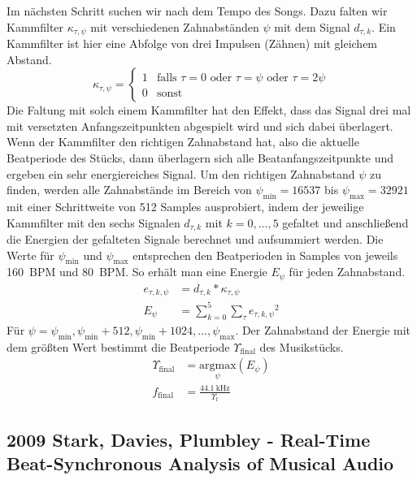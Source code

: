 {{{			%
			Im nächsten Schritt suchen wir nach dem Tempo des Songs.
			Dazu falten wir Kammfilter $\kappa_{\tau, \psi}$ mit verschiedenen Zahnabständen $\psi$ mit dem Signal $d_{\tau, k}$.
			Ein Kammfilter ist hier eine Abfolge von drei Impulsen (Zähnen) mit gleichem Abstand.
			\begin{equation}
				\kappa_{\tau, \psi} =
					\begin{cases}
						1 & \text{falls } \tau = 0 \text{ oder } \tau = \psi \text{ oder } \tau = 2\psi \\
						0 & \text{sonst}
					\end{cases}
			\end{equation}
			Die Faltung mit solch einem Kammfilter hat den Effekt,
				dass das Signal drei mal mit versetzten Anfangszeitpunkten abgespielt wird
				und sich dabei überlagert.
			Wenn der Kammfilter den richtigen Zahnabstand hat,
				also die aktuelle Beatperiode des Stücks,
				dann überlagern sich alle Beatanfangszeitpunkte
				und ergeben ein sehr energiereiches Signal.
			Um den richtigen Zahnabstand $\psi$ zu finden,
				werden alle Zahnabstände im Bereich von $\psi_\text{min} = \num{16537}$ bis $\psi_\text{max} = \num{32921}$
				mit einer Schrittweite von \num{512} Samples ausprobiert,
				indem der jeweilige Kammfilter mit den sechs Signalen $d_{\tau, k}$ mit $k = 0, ..., 5$ gefaltet
				und anschließend die Energien der gefalteten Signale berechnet und aufsummiert werden.
			Die Werte für $\psi_\text{min}$ und $\psi_\text{max}$ entsprechen den Beatperioden in Samples von jeweils \SI{160}{BPM} und \SI{80}{BPM}.
			So erhält man eine Energie $E_\psi$ für jeden Zahnabstand.
			\begin{align}
				e_{\tau, k, \psi} &= d_{\tau, k} * \kappa_{\tau, \psi} \\
				E_\psi &= \sum_{k = 0}^5 \sum_\tau {e_{\tau, k, \psi}}^2
			\end{align}
			Für $\psi = \psi_\text{min}, \psi_\text{min} + 512, \psi_\text{min} + 1024, ..., \psi_\text{max}$.
			Der Zahnabstand der Energie mit dem größten Wert bestimmt die Beatperiode $\Upsilon_\text{final}$ des Musikstücks.
			\begin{align}
				\Upsilon_\text{final} &= \underset{\psi}{\text{argmax}}(E_\psi) \\
				f_\text{final} &= \frac{\SI{44.1}{\kilo\hertz}}{\Upsilon_\text{f}}
			\end{align}
		}
	}

	\subsection{2009 Stark, Davies, Plumbley - Real-Time Beat-Synchronous Analysis of Musical Audio}
	{
}}
